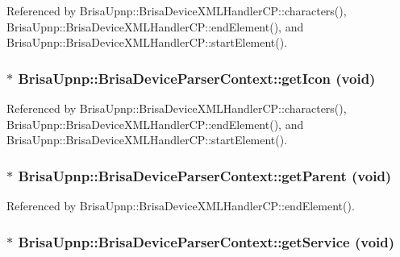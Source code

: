 Referenced by BrisaUpnp::BrisaDeviceXMLHandlerCP::characters(), BrisaUpnp::BrisaDeviceXMLHandlerCP::endElement(), and BrisaUpnp::BrisaDeviceXMLHandlerCP::startElement().\hypertarget{classBrisaUpnp_1_1BrisaDeviceParserContext_a9990193a19efeef6de769eb3fb8d6907}{
\subsubsection[{getIcon}]{$\ast$ BrisaUpnp::BrisaDeviceParserContext::getIcon (void)}}
\label{classBrisaUpnp_1_1BrisaDeviceParserContext_a9990193a19efeef6de769eb3fb8d6907}


Referenced by BrisaUpnp::BrisaDeviceXMLHandlerCP::characters(), BrisaUpnp::BrisaDeviceXMLHandlerCP::endElement(), and BrisaUpnp::BrisaDeviceXMLHandlerCP::startElement().\hypertarget{classBrisaUpnp_1_1BrisaDeviceParserContext_adb64094f707661e92b1688b3d1919fc1}{
\subsubsection[{getParent}]{$\ast$ BrisaUpnp::BrisaDeviceParserContext::getParent (void)}}
\label{classBrisaUpnp_1_1BrisaDeviceParserContext_adb64094f707661e92b1688b3d1919fc1}


Referenced by BrisaUpnp::BrisaDeviceXMLHandlerCP::endElement().\hypertarget{classBrisaUpnp_1_1BrisaDeviceParserContext_addd9457a1394a11d2477187784c602f0}{
\subsubsection[{getService}]{$\ast$ BrisaUpnp::BrisaDeviceParserContext::getService (void)}}
\label{classBrisaUpnp_1_1BrisaDeviceParserContext_addd9457a1394a11d2477187784c602f0}



